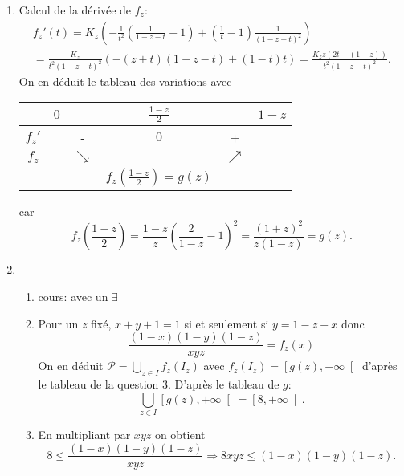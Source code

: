 \begin{enumerate}
 \item Calcul de la dérivée de $f_z$:
\begin{multline*}
 f_z'(t) = K_z\left( -\frac{1}{t^2}(\frac{1}{1-z-t}-1) + (\frac{1}{t}-1)\frac{1}{(1-z-t)^2}\right)\\
 = \frac{K_z}{t^2(1-z-t)^2}\left( -(z+t)(1-z-t) +(1-t)t\right) 
 = \frac{K_z z \left(2t-(1-z)\right)}{t^2(1-z-t)^2}. 
\end{multline*}
On en déduit le tableau des variations avec 
\begin{center}
\renewcommand{\arraystretch}{1.5}
\begin{tabular}{|c|ccccc|}\hline
       & $0$ &            & $\frac{1-z}{2}$      &            & $1-z$\\ \hline
$f_z'$ &     & -          & $0$                  & +          & \\ \hline
$f_z$  &     & $\searrow$ &                      & $\nearrow$ & \\
       &     &            & $f_z(\frac{1-z}{2}) = g(z)$ &            & \\ \hline
\end{tabular}
\end{center}
car 
\[
f_z(\frac{1-z}{2})= \frac{1-z}{z}\left(\frac{2}{1-z}-1\right)^2  = \frac{(1+z)^2}{z(1-z)} = g(z).
\]

 \item
\begin{enumerate}
 \item cours: avec un $\exists$
 \item Pour un $z$ fixé, $x+y+1=1$ si et seulement si $y=1-z-x$ donc
\[
 \frac{(1-x)(1-y)(1-z)}{xyz} = f_z(x)
\]
On en déduit $\mathcal{P} = \bigcup_{z\in I}f_z(I_z)$ avec $f_z(I_z) = \left[ g(z), +\infty \right[$ d'après le tableau de la question 3. 
D'après le tableau de $g$:
\[
 \bigcup_{z\in I}\left[ g(z), +\infty\right[ = \left[ 8, +\infty \right[. 
\]

 \item En multipliant par $xyz$ on obtient
\[
 8 \leq \frac{(1-x)(1-y)(1-z)}{xyz} \Rightarrow 8xyz \leq (1-x)(1-y)(1-z).
\]
\end{enumerate}

\end{enumerate}


